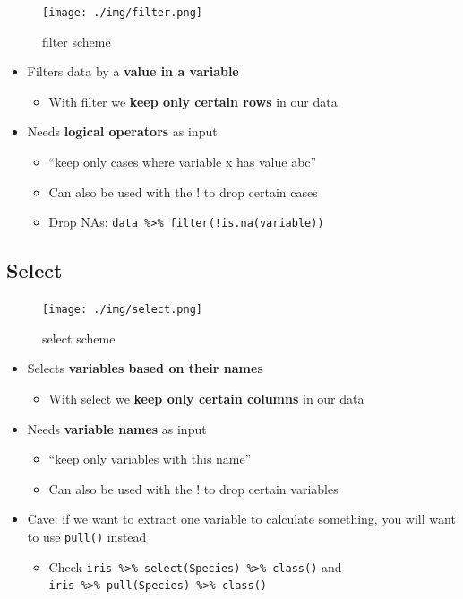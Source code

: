 \documentclass[
]{book}
\providecommand{\tightlist}{%
  \setlength{\itemsep}{0pt}\setlength{\parskip}{0pt}}
\begin{document}
\begin{figure}
\centering
\texttt{[image: ./img/filter.png]}
\caption{filter scheme}
\end{figure}

\begin{itemize}
\tightlist
\item
  Filters data by a \textbf{value in a variable}

  \begin{itemize}
  \tightlist
  \item
    With filter we \textbf{keep only certain rows} in our data
  \end{itemize}
\item
  Needs \textbf{logical operators} as input

  \begin{itemize}
  \tightlist
  \item
    ``keep only cases where variable x has value abc''
  \item
    Can also be used with the ! to drop certain cases
  \item
    Drop NAs: \texttt{data\ \%\textgreater{}\%\ filter(!is.na(variable))}
  \end{itemize}
\end{itemize}

\subsection{Select}\label{select}

\begin{figure}
\centering
\texttt{[image: ./img/select.png]}
\caption{select scheme}
\end{figure}

\begin{itemize}
\tightlist
\item
  Selects \textbf{variables based on their names}

  \begin{itemize}
  \tightlist
  \item
    With select we \textbf{keep only certain columns} in our data
  \end{itemize}
\item
  Needs \textbf{variable names} as input

  \begin{itemize}
  \tightlist
  \item
    ``keep only variables with this name''
  \item
    Can also be used with the ! to drop certain variables
  \end{itemize}
\item
  Cave: if we want to extract one variable to calculate something, you will want to use \texttt{pull()} instead

  \begin{itemize}
  \tightlist
  \item
    Check \texttt{iris\ \%\textgreater{}\%\ select(Species)\ \%\textgreater{}\%\ class()} and \texttt{iris\ \%\textgreater{}\%\ pull(Species)\ \%\textgreater{}\%\ class()}
  \end{itemize}
\end{itemize}
\end{document}
